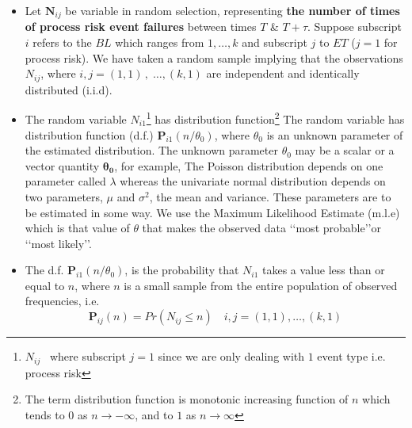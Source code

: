 \documentclass[]{article}
\let\rmarkdownfootnote\footnote%
\def\footnote{\protect\rmarkdownfootnote}
\begin{document}
\begin{itemize}
\item Let $\mathbf{N}_{ij}$ be variable in random selection, representing \textbf{the number of times of process risk event failures} between times $T$ \& $T +\tau$. Suppose subscript $i$ refers to the $BL$ which ranges from \begin{math} 1, \ldots, k \end{math} and subscript $j$ to $ET$ ($j=1$ for process risk). We have taken a random sample implying that the observations \begin{math} N_{ij}\end{math}, {where} \begin{math}{i,j}= (1,1)\,,\;\ldots, (k,1)\end{math} are independent and identically distributed (i.i.d). 

\item The random variable $N_{i1}$\footnote{$N_{ij}$ \, where subscript $j=1$ since we are only dealing with $1$ event type i.e. process risk} has distribution function\footnote{The term distribution function is monotonic increasing function of $n$ which tends to $0$ as \begin{math} n \longrightarrow -\infty\end{math}, and to $1$ as \begin{math} n \longrightarrow \infty \end{math}} The random variable has distribution function (d.f.) \begin{math}\mathbf{P}_{i1}(n/\theta_0)  \end{math}, where $\theta_0$ is an unknown parameter of the estimated distribution.  The unknown parameter $\theta_0$ may be a scalar or a vector quantity \begin{math}\mathbf{\theta_0}\end{math}, for example, The Poisson distribution depends on one parameter called $\lambda$ whereas the univariate normal distribution depends on two parameters, $\mu$ and $\sigma ^2$, the mean and variance.  These parameters are to be estimated in some way. We use the Maximum Likelihood Estimate (m.l.e) which is that value of $\theta$ that makes the observed data \lq\lq most probable\rq\rq or \lq\lq most likely\rq\rq.\medskip

\item The d.f. \begin{math}\mathbf{P}_{i1}(n/\theta_0)  \end{math}, is the probability that $N_{i1}$ takes a value less than or equal to $n$, where $n$ is a small sample from the entire population of observed frequencies, i.e.
\singlespacing
\begin{equation}\label{PDF}
\mathbf{P}_{ij}(n)=Pr \left(N_{ij}\leq n \right) \quad{i,j}= (1,1),\ldots, (k,1)
\end{equation}
\doublespacing


\end{itemize}
\end{document}
